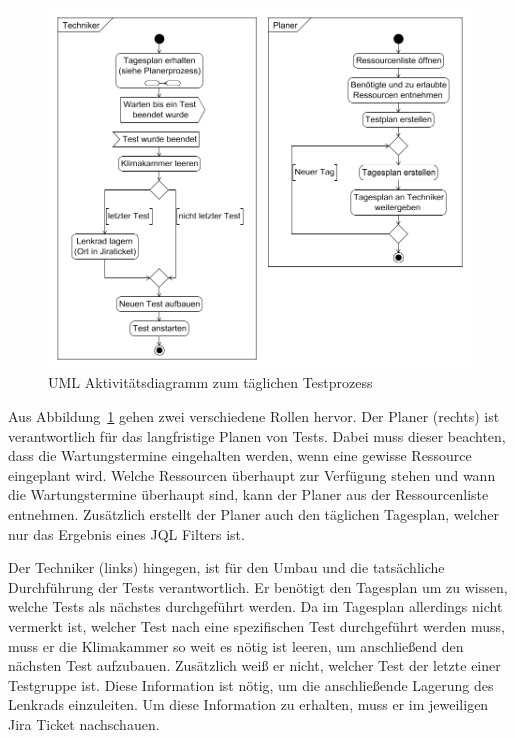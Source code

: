 \begin{figure}[H]
    \includegraphics[width=\linewidth]{diagramme/TechnikerPlanerProzess.png}
    \caption{UML Aktivitätsdiagramm zum täglichen Testprozess}\label{fig:TechnikerPlanerProzess}
\end{figure}

Aus Abbildung~\ref{fig:TechnikerPlanerProzess} gehen zwei verschiedene Rollen hervor. Der
Planer (rechts) ist verantwortlich für das langfristige Planen von Tests. Dabei muss
dieser beachten, dass die Wartungstermine eingehalten werden, wenn
eine gewisse Ressource eingeplant wird. Welche Ressourcen überhaupt zur
Verfügung stehen und wann die Wartungstermine überhaupt sind, kann der Planer aus
der Ressourcenliste entnehmen. Zusätzlich erstellt der Planer auch den täglichen 
Tagesplan, welcher nur das Ergebnis eines \gls{JQL} Filters ist. 

Der Techniker (links) hingegen, ist für den Umbau und die tatsächliche Durchführung der 
Tests verantwortlich. Er benötigt den Tagesplan um zu wissen, welche Tests als 
nächstes durchgeführt werden. Da im Tagesplan allerdings nicht vermerkt ist, 
welcher Test nach eine spezifischen Test durchgeführt werden muss, muss er die 
Klimakammer so weit es nötig ist leeren, um anschließend den nächsten Test 
aufzubauen. Zusätzlich weiß er nicht, welcher Test der letzte einer Testgruppe ist.
Diese Information ist nötig, um die anschließende Lagerung des Lenkrads einzuleiten.
Um diese Information zu erhalten, muss er im jeweiligen Jira Ticket nachschauen. \\

